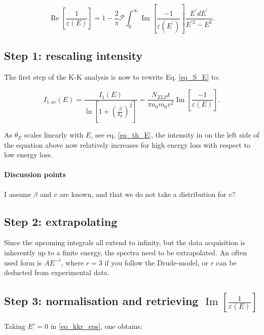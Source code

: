 \begin{equation}\label{eq_kkr_eps}
    \operatorname{Re}\left[\frac{1}{\varepsilon(E)}\right]=1-\frac{2}{\pi} \mathcal{P} \int_{0}^{\infty} \operatorname{Im}\left[\frac{-1}{\varepsilon\left(E^{\prime}\right)}\right] \frac{E^{\prime} d E^{\prime}}{E^{\prime 2}-E^{2}}.
\end{equation}




\subsection{Step 1: rescaling intensity}
The first step of the K-K analysis is now to rewrite Eq. \eqref{eq_S_E} to:

\begin{equation}\label{eq_J_ac}
    I_{1,ac}(E) = \frac{I_1(E)}{\ln \left[1+\left(\frac{\beta}{\theta_{E}}\right)^{2}\right]} =\frac{N_{ZLP} t}{\pi a_{0} m_{0} v^{2}}  \operatorname{Im}\left[\frac{-1}{\varepsilon(E)}\right] .
\end{equation}


As $\theta_E$ scales linearly with $E$, see eq. \eqref{eq_th_E}, the intensity in on the left side of the equation above now relatively increases for high energy loss with respect to low energy loss.


\paragraph{Discussion points} I assume $\beta$ and $v$ are known, and that we do not take a distribution for $v$? 


\subsection{Step 2: extrapolating}
Since the upcoming integrals all extend to infinity, but the data acquisition is inherently up to a finite energy, the spectra need to be extrapolated. An often used form is $AE^{-r}$, where $r=3$ if you follow the Drude-model, or $r$ can be deducted from experimental data.



\subsection{Step 3: normalisation and retrieving $\operatorname{Im}\left[\frac{1}{\varepsilon(E)}\right]$}

Taking $E' = 0$ in \eqref{eq_kkr_eps}, one obtains:

